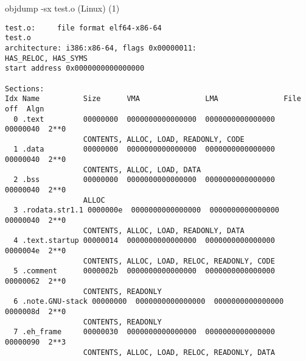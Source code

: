 \begin{frame}[fragile,label=objdumpSXO1]{objdump -sx test.o (Linux) (1)}
\begin{lstlisting}[language={},style=script]
test.o:     file format elf64-x86-64
test.o
architecture: i386:x86-64, flags 0x00000011:
HAS_RELOC, HAS_SYMS
start address 0x0000000000000000

Sections:
Idx Name          Size      VMA               LMA               File off  Algn
  0 .text         00000000  0000000000000000  0000000000000000  00000040  2**0
                  CONTENTS, ALLOC, LOAD, READONLY, CODE
  1 .data         00000000  0000000000000000  0000000000000000  00000040  2**0
                  CONTENTS, ALLOC, LOAD, DATA
  2 .bss          00000000  0000000000000000  0000000000000000  00000040  2**0
                  ALLOC
  3 .rodata.str1.1 0000000e  0000000000000000  0000000000000000  00000040  2**0
                  CONTENTS, ALLOC, LOAD, READONLY, DATA
  4 .text.startup 00000014  0000000000000000  0000000000000000  0000004e  2**0
                  CONTENTS, ALLOC, LOAD, RELOC, READONLY, CODE
  5 .comment      0000002b  0000000000000000  0000000000000000  00000062  2**0
                  CONTENTS, READONLY
  6 .note.GNU-stack 00000000  0000000000000000  0000000000000000  0000008d  2**0
                  CONTENTS, READONLY
  7 .eh_frame     00000030  0000000000000000  0000000000000000  00000090  2**3
                  CONTENTS, ALLOC, LOAD, RELOC, READONLY, DATA
\end{lstlisting}
\end{frame}

